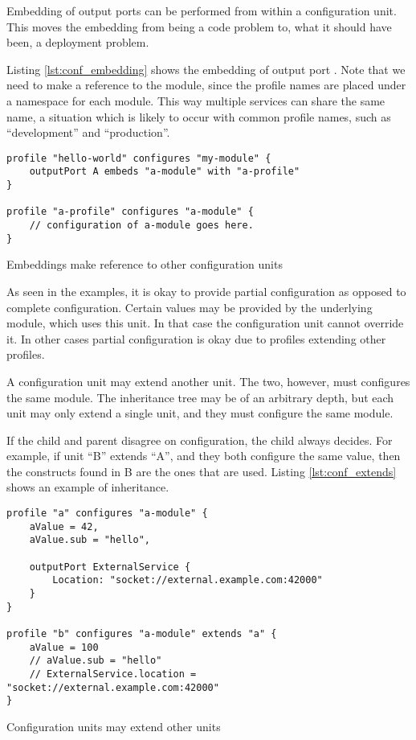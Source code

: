 Embedding of output ports can be performed from within a configuration unit.
This moves the embedding from being a code problem to, what it should have
been, a deployment problem.

Listing \ref{lst:conf_embedding} shows the embedding of output port .
Note that we need to make a reference to the module, since the profile names
are placed under a namespace for each module. This way multiple services can
share the same name, a situation which is likely to occur with common profile
names, such as ``development'' and ``production''.

\begin{listing}[H]
\begin{verbatim}
profile "hello-world" configures "my-module" {
    outputPort A embeds "a-module" with "a-profile"
}

profile "a-profile" configures "a-module" {
    // configuration of a-module goes here.
}
\end{verbatim}
\caption{Embeddings make reference to other configuration units}
\label{lst:conf_embedding}
\end{listing}

As seen in the examples, it is okay to provide partial configuration as opposed
to complete configuration. Certain values may be provided by the underlying
module, which uses this unit. In that case the configuration unit cannot
override it.  In other cases partial configuration is okay due to profiles
extending other profiles.

A configuration unit may extend another unit. The two, however, must configures
the same module. The inheritance tree may be of an arbitrary depth, but
each unit may only extend a single unit, and they must configure the same
module.

If the child and parent disagree on configuration, the child always decides.
For example, if unit ``B'' extends ``A'', and they both configure the same
value, then the constructs found in B are the ones that are used. Listing
\ref{lst:conf_extends} shows an example of inheritance.

\begin{listing}[H]
\begin{verbatim}
profile "a" configures "a-module" {
    aValue = 42,
    aValue.sub = "hello",

    outputPort ExternalService {
        Location: "socket://external.example.com:42000"
    }
}

profile "b" configures "a-module" extends "a" {
    aValue = 100
    // aValue.sub = "hello"
    // ExternalService.location = "socket://external.example.com:42000"
}
\end{verbatim}
\caption{Configuration units may extend other units}
\label{lst:conf_extends}
\end{listing}

